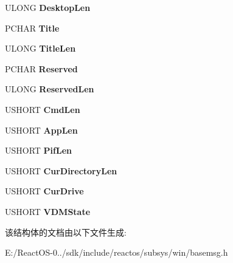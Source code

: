 \begin{DoxyCompactItemize}
\item 
\mbox{\label{struct___b_a_s_e___c_h_e_c_k___v_d_m_ac60cc6bb0cb846bbf5773b78c982c974}} 
U\+L\+O\+NG {\bfseries Desktop\+Len}
\item 
\mbox{\label{struct___b_a_s_e___c_h_e_c_k___v_d_m_a59444a5a1a59d82051b25497b0bf2902}} 
P\+C\+H\+AR {\bfseries Title}
\item 
\mbox{\label{struct___b_a_s_e___c_h_e_c_k___v_d_m_a214677da673587be5082d168d45544b3}} 
U\+L\+O\+NG {\bfseries Title\+Len}
\item 
\mbox{\label{struct___b_a_s_e___c_h_e_c_k___v_d_m_a7e97440dce5d71180d97bfa35f6c32f8}} 
P\+C\+H\+AR {\bfseries Reserved}
\item 
\mbox{\label{struct___b_a_s_e___c_h_e_c_k___v_d_m_a6088b72708aecc51ecb169481f7facdc}} 
U\+L\+O\+NG {\bfseries Reserved\+Len}
\item 
\mbox{\label{struct___b_a_s_e___c_h_e_c_k___v_d_m_af1bdeccf5f98ecd0a93e7a21f65f026b}} 
U\+S\+H\+O\+RT {\bfseries Cmd\+Len}
\item 
\mbox{\label{struct___b_a_s_e___c_h_e_c_k___v_d_m_affbe24293c185f5a58a08f17802bcd02}} 
U\+S\+H\+O\+RT {\bfseries App\+Len}
\item 
\mbox{\label{struct___b_a_s_e___c_h_e_c_k___v_d_m_ad94824566b1f733144455197103f8826}} 
U\+S\+H\+O\+RT {\bfseries Pif\+Len}
\item 
\mbox{\label{struct___b_a_s_e___c_h_e_c_k___v_d_m_a2fae4d24c98b43ddd5839864f54a43bd}} 
U\+S\+H\+O\+RT {\bfseries Cur\+Directory\+Len}
\item 
\mbox{\label{struct___b_a_s_e___c_h_e_c_k___v_d_m_a06649a70c17a5e56c82c61b32152e739}} 
U\+S\+H\+O\+RT {\bfseries Cur\+Drive}
\item 
\mbox{\label{struct___b_a_s_e___c_h_e_c_k___v_d_m_a300f02f592cf82276871dadb1235b1c6}} 
U\+S\+H\+O\+RT {\bfseries V\+D\+M\+State}
\end{DoxyCompactItemize}


该结构体的文档由以下文件生成\+:\begin{DoxyCompactItemize}
\item 
E\+:/\+React\+O\+S-\/0../sdk/include/reactos/subsys/win/basemsg.\+h\end{DoxyCompactItemize}
